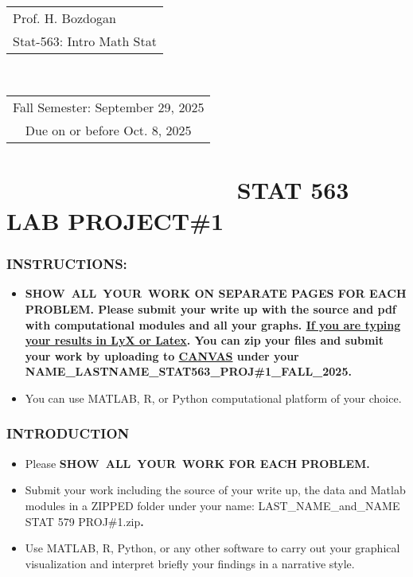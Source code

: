 \documentclass[12pt,thmsa]{article}
\begin{document}
\begin{tabular}{l}
Prof. H. Bozdogan \\ 
Stat-563: Intro Math Stat%
\end{tabular}
\ \ \ \ \ \ \ \ \ \ \ \ \ \ \ \ \ \ \ \ \ \ \ \ \ \ \ \ \ \ \ \ \ \ \ \ \ \
\ \ \ \ \ \ \ 
\begin{tabular}{c}
Fall Semester: September 29, 2025 \\ 
Due on or before Oct. 8, 2025%
\end{tabular}

\smallskip

\section{ \ \ \ \ \ \ \ \ \ \ \ \ \ \ \ \ \ \ STAT 563 LAB PROJECT\#1}

\smallskip

\subsubsection{INSTRUCTIONS:}

\smallskip

\begin{itemize}
\item \textbf{SHOW\ ALL\ YOUR\ WORK ON SEPARATE PAGES FOR EACH PROBLEM.
Please submit your write up with the source and pdf with computational
modules and all your graphs. \underline{\textbf{If you are typing your
results in LyX or Latex}}. You can zip your files and submit your work by
uploading to \underline{\textbf{CANVAS}} under your
NAME\_LASTNAME\_STAT563\_PROJ\#1\_FALL\_2025.}

\item You can use MATLAB, R, or Python computational platform of your
choice.\ 
\end{itemize}

\smallskip

\subsubsection{INTRODUCTION}

\vspace{1pt}

\begin{itemize}
\item Please \textbf{SHOW\ ALL\ YOUR\ WORK FOR EACH PROBLEM. }

\item Submit your work including the source of your write up, the data and
Matlab modules in a ZIPPED folder under your name: LAST\_NAME\_and\_NAME
STAT 579 PROJ\#1.zip\textbf{.}

\item Use MATLAB, R, Python, or any other software to carry out your
graphical visualization and interpret briefly your findings in a narrative
style.
\end{itemize}
\end{document}
